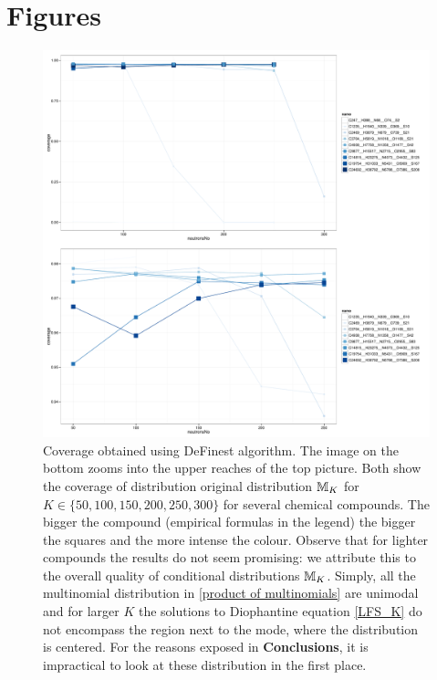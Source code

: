 \section*{Figures}


\begin{figure}[htbp]
 \centering
 \includegraphics[width=.8\textwidth]{./img/DeFineCoverage}
 \caption{Coverage obtained using {\sc DeFinest} algorithm. The image on the bottom zooms into the upper reaches of the top picture. Both show the coverage of distribution original distribution $\mathbb{M}_K$ for $K \in \{50, 100, 150, 200, 250, 300 \}$ for several chemical compounds. The bigger the compound (empirical formulas in the legend) the bigger the squares and the more intense the colour. Observe that for lighter compounds the results do not seem promising: we attribute this to the overall quality of conditional distributions $\mathbb{M}_K$. Simply, all the multinomial distribution in \eqref{product of multinomials} are unimodal and for larger $K$ the solutions to Diophantine equation \eqref{LFS_K} do not encompass the region next to the mode, where the distribution is centered. For the reasons exposed in \textbf{Conclusions}, it is impractical to look at these distribution in the first place.}
 \label{figure: Coverage}
\end{figure}

